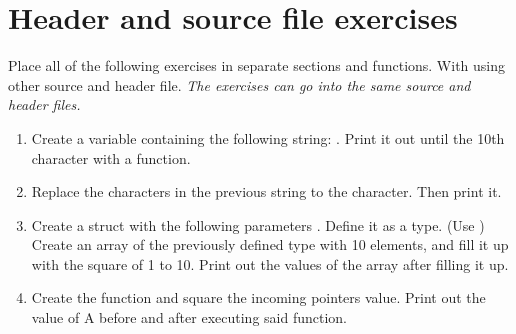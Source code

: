 \documentclass[12pt,a4paper]{article}
\begin{document}
    \section{Header and source file exercises}
    Place all of the following exercises in separate sections and functions. With using other source and header file.
    \textit{The exercises can go into the same source and header files.}
    \begin{enumerate}
        \item Create a variable containing the following string: . Print it out until
              the 10th character with a function.
        \item Replace the  characters in the previous string to the  character. Then print it.
        \item Create a struct with the following parameters . Define it as a type.
              (Use )\\
              Create an array of the previously defined type with 10 elements, and fill it up with the square of 1 to 10.
              Print out the values of the array after filling it up.
        \item Create the function  and square the incoming pointers value.
              Print out the value of A before and after executing said function.
    \end{enumerate}

    \newpage
\end{document}
